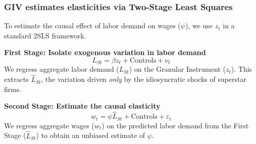 \documentclass[aspectratio=169,11pt]{beamer}
\begin{document}
\begin{frame}
    \frametitle{GIV estimates elasticities via Two-Stage Least Squares}

    \vspace{0.3cm}
    {\Large
        To estimate the causal effect of labor demand on wages ($\psi$), we use $z_t$ in a standard 2SLS framework.
    }

    \vspace{0.8cm}
    \textbf{First Stage: Isolate exogenous variation in labor demand}
    \vspace{0.2cm}
    \begin{equation*}
        L_{St} = \beta z_t + \text{Controls} + \nu_t
    \end{equation*}
    \vspace{0.1cm}
    We regress aggregate labor demand ($L_{St}$) on the Granular Instrument ($z_t$). This extracts $\widehat{L}_{St}$, the variation driven \emph{only} by the idiosyncratic shocks of superstar firms.

    \vspace{0.8cm}
    \textbf{Second Stage: Estimate the causal elasticity}
    \vspace{0.2cm}
    \begin{equation*}
        w_t = \psi \widehat{L}_{St} + \text{Controls} + \varepsilon_t
    \end{equation*}
    \vspace{0.1cm}
    We regress aggregate wages ($w_t$) on the predicted labor demand from the First Stage ($\widehat{L}_{St}$) to obtain an unbiased estimate of $\psi$.

\end{frame}
\end{document}

